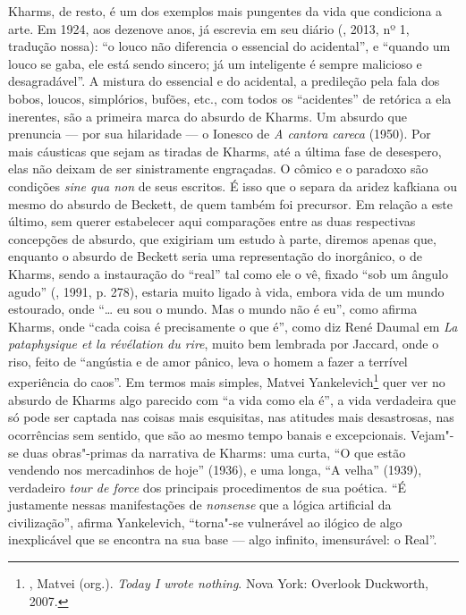 Kharms, de resto, é um dos exemplos mais pungentes da vida que condiciona a arte.
Em 1924, aos dezenove anos, já escrevia em seu diário (, 2013, nº 1, tradução nossa): ``o
louco não diferencia o essencial do acidental'', e ``quando um louco se
gaba, ele está sendo sincero; já um inteligente é sempre malicioso e
desagradável''. A mistura do essencial e do acidental, a predileção pela
fala dos bobos, loucos, simplórios, bufões, etc., com todos os
``acidentes'' de retórica a ela inerentes, são a primeira marca do
absurdo de Kharms. Um absurdo que prenuncia --- por sua hilaridade --- o
Ionesco de \emph{A cantora careca} (1950). Por mais cáusticas que sejam 
as tiradas de Kharms, até a última fase de desespero, elas não deixam de
ser sinistramente engraçadas. O cômico e o paradoxo são condições
\emph{sine qua non} de seus escritos. É isso que o separa da aridez
kafkiana ou mesmo do absurdo de Beckett, de quem também foi precursor.
Em relação a este último, sem querer estabelecer aqui comparações entre
as duas respectivas concepções de absurdo, que exigiriam um estudo à
parte, diremos apenas que, enquanto o absurdo de Beckett seria uma
representação do inorgânico, o de Kharms, sendo a instauração do
``real'' tal como ele o vê, fixado ``sob um ângulo agudo'' (, 1991, p. 278), estaria muito ligado à vida, embora vida de
um mundo estourado, onde ``\ldots{} eu sou o mundo. Mas o mundo não é eu'',
como afirma Kharms, onde ``cada coisa é precisamente o que é'', como diz
René Daumal em \emph{La pataphysique et la révélation du rire}, muito
bem lembrada por Jaccard, onde o riso, feito de
``angústia e de amor pânico, leva o homem a fazer a terrível experiência
do caos''. Em termos mais simples, Matvei 
Yankelevich\footnote{, Matvei (org.). \emph{Today I wrote nothing}. Nova York: Overlook Duckworth, 2007.} quer ver no absurdo de Kharms algo parecido com ``a vida como ela
é'', a vida verdadeira que só pode ser captada nas coisas mais
esquisitas, nas atitudes mais desastrosas, nas ocorrências sem sentido,
que são ao mesmo tempo banais e excepcionais. Vejam"-se duas obras"-primas
da narrativa de Kharms: uma curta, ``O que estão vendendo
nos mercadinhos de hoje'' (1936), e uma longa, ``A velha'' (1939),
verdadeiro \emph{tour de force} dos principais procedimentos de sua
poética. ``É justamente nessas manifestações de \emph{nonsense} que a
lógica artificial da civilização'', afirma Yankelevich, ``torna"-se
vulnerável ao ilógico de algo inexplicável que se encontra na sua base
--- algo infinito, imensurável: o Real''.

